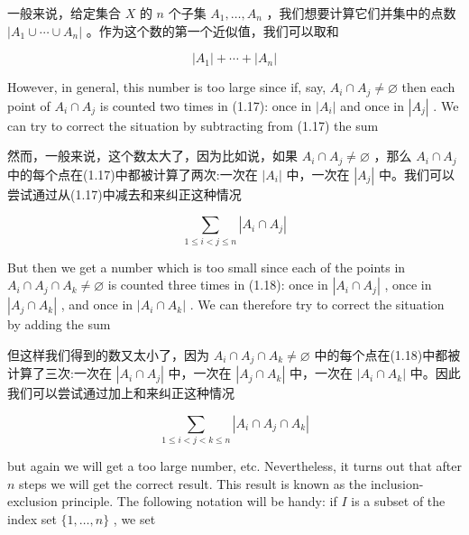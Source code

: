 \documentclass[10pt]{article}
\begin{document}
\begin{tcolorbox}\relax
一般来说，给定集合 \(X\) 的 \(n\) 个子集 \({A}_{1},\ldots ,{A}_{n}\) ，我们想要计算它们并集中的点数 \(\left| {{A}_{1} \cup  \cdots  \cup  {A}_{n}}\right|\) 。作为这个数的第一个近似值，我们可以取和
\end{tcolorbox}

\[
\left| {A}_{1}\right|  + \cdots  + \left| {A}_{n}\right| \tag{1.17}
\]

However, in general, this number is too large since if, say, \({A}_{i} \cap  {A}_{j} \neq  \varnothing\) then each point of \({A}_{i} \cap  {A}_{j}\) is counted two times in (1.17): once in \(\left| {A}_{i}\right|\) and once in \(\left| {A}_{j}\right|\) . We can try to correct the situation by subtracting from (1.17) the sum

\begin{tcolorbox}\relax
然而，一般来说，这个数太大了，因为比如说，如果 \({A}_{i} \cap  {A}_{j} \neq  \varnothing\) ，那么 \({A}_{i} \cap  {A}_{j}\) 中的每个点在(1.17)中都被计算了两次:一次在 \(\left| {A}_{i}\right|\) 中，一次在 \(\left| {A}_{j}\right|\) 中。我们可以尝试通过从(1.17)中减去和来纠正这种情况
\end{tcolorbox}

\[
\mathop{\sum }\limits_{{1 \leq  i < j \leq  n}}\left| {{A}_{i} \cap  {A}_{j}}\right| \tag{1.18}
\]

But then we get a number which is too small since each of the points in \({A}_{i} \cap  {A}_{j} \cap  {A}_{k} \neq  \varnothing\) is counted three times in (1.18): once in \(\left| {{A}_{i} \cap  {A}_{j}}\right|\) , once in \(\left| {{A}_{j} \cap  {A}_{k}}\right|\) , and once in \(\left| {{A}_{i} \cap  {A}_{k}}\right|\) . We can therefore try to correct the situation by adding the sum

\begin{tcolorbox}\relax
但这样我们得到的数又太小了，因为 \({A}_{i} \cap  {A}_{j} \cap  {A}_{k} \neq  \varnothing\) 中的每个点在(1.18)中都被计算了三次:一次在 \(\left| {{A}_{i} \cap  {A}_{j}}\right|\) 中，一次在 \(\left| {{A}_{j} \cap  {A}_{k}}\right|\) 中，一次在 \(\left| {{A}_{i} \cap  {A}_{k}}\right|\) 中。因此我们可以尝试通过加上和来纠正这种情况
\end{tcolorbox}

\[
\mathop{\sum }\limits_{{1 \leq  i < j < k \leq  n}}\left| {{A}_{i} \cap  {A}_{j} \cap  {A}_{k}}\right|
\]

but again we will get a too large number, etc. Nevertheless, it turns out that after \(n\) steps we will get the correct result. This result is known as the inclusion-exclusion principle. The following notation will be handy: if \(I\) is a subset of the index set \(\{ 1,\ldots ,n\}\) , we set
\end{document}
